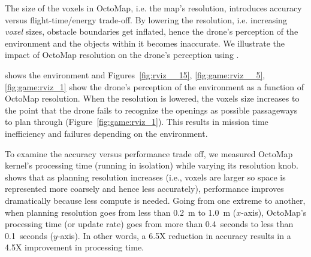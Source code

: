 The size of the voxels in OctoMap, i.e. the map's resolution, introduces accuracy versus flight-time/energy trade-off. By lowering the resolution, i.e. increasing \emph{voxel} sizes, obstacle boundaries get inflated, hence the drone's perception of the environment and the objects within it becomes inaccurate. We illustrate the impact of OctoMap resolution on the drone's perception using .  {shows the environment and  Figures~\ref{fig:rviz__15}, \ref{fig:game:rviz__5}, \ref{fig:game:rviz_1} show the drone's perception of the environment as a function of OctoMap resolution. When the resolution is lowered, the voxels size increases to the point that the drone fails to recognize the openings as possible passageways to plan through (Figure~\ref{fig:game:rviz_1}). This results in mission time inefficiency and failures depending on the environment.

To examine the accuracy versus performance trade off, we measured OctoMap kernel's processing time (running in isolation) while varying its resolution knob.  shows that as planning resolution increases (i.e., voxels are larger so space is represented more coarsely and hence less accurately), performance improves dramatically because less compute is needed. Going from one extreme to another, when planning resolution goes from less than 0.2~m to 1.0~m ($x$-axis), OctoMap's processing time (or update rate) goes from more than 0.4~seconds to less than 0.1~seconds ($y$-axis). In other words, a 6.5X reduction in accuracy results in a 4.5X improvement in processing time.


}
